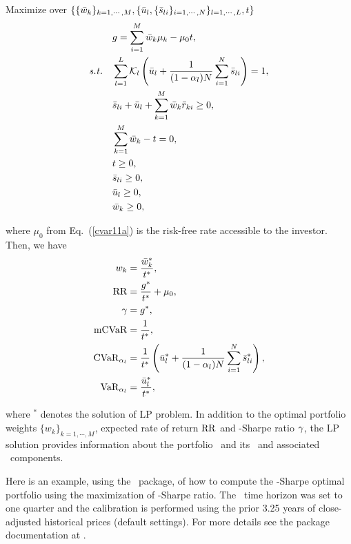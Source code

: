 \bigskip
\noindent Maximize over $\{\{{\bar w}_k\}_{k=1,\cdots,M}, \{ {\bar u}_l, \{{\bar s}_{li}\}_{i=1,\cdots,N}\}_{l=1,\cdots,L}, t\}$
\begin{subequations}\label{cvar11}
\begin{align}
    &g = \sum_{i=1}^M \bw_k \mu_k - \mu_0 t, \label{cvar11a} \\
    \st &\sum_{l=1}^L \cK_l \left( \bu_l + \frac{1}{(1 - \alpha_l) N} \sum_{i=1}^N \bs_{li} \right) = 1, \label{cvar11d} \\
        &\bs_{li} + \bu_l + \sum_{k=1}^M \bw_k \br_{ki} \geq 0, \label{cvar11b} \\
        &\sum_{k=1}^M \bw_k - t = 0, \label{cvar11c} \\
        &t \geq 0, \label{cvar11h} \\
        &\bs_{li} \geq 0, \label{cvar11e} \\
        &\bu_l \geq 0, \label{cvar11f} \\
        &\bw_k \geq 0, \label{cvar11g}
\end{align}
\end{subequations}

\noindent where $\mu_0$ from Eq.~(\ref{cvar11a}) is the risk-free rate accessible to the investor.
Then, we have
\begin{subequations}\label{cvar12}
\begin{align}
    w_k &= \frac{\bw_k^*}{t^*} , \label{cvar12a} \\
    \RR &= \frac{g^*}{t^*}  + \mu_0, \label{cvar12b} \\
    \Sharpe & = g^*, \label{cvar12c} \\
    \mCVaR &= \frac{1}{t^*}, \label{cvar12d} \\
    \CVaR_{\alpha_l} &= \frac{1}{t^*} \left( \bu_l^* + \frac{1}{(1 - \alpha_l) N} \sum_{i=1}^N \bs_{li}^* \right), \label{cvar12e} \\
    \VaR_{\alpha_l} &= \frac{\bu_l^*}{t^*} , \label{cvar12f}
\end{align}
\end{subequations}

\noindent where $^*$ denotes the solution of LP problem.
In addition to the optimal portfolio weights $\{w_k\}_{k=1,\cdots,M}$, expected rate of return ${\rm RR}$ and \mCVaR-Sharpe ratio ${\gamma}$,
the LP solution provides information about the portfolio \mCVaR\ and its \CVaR\  and associated \VaR\ components.

\bigskip
\noindent Here is an example, using the \azapy\ package, of how to compute the \mCVaR-Sharpe optimal portfolio using the maximization
of \mCVaR-Sharpe ratio.
The \mCVaR\ time horizon was set to one quarter and the calibration is performed using the prior 3.25 years of
close-adjusted historical prices (default settings).
For more details see the package documentation at \azapydoc.

